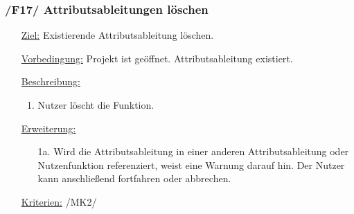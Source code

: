 \documentclass{article}
\begin{document}
\subsubsection*{/F17/ Attributsableitungen löschen}
\begin{itemize}
    \item[\underline{Ziel:}] Existierende Attributsableitung löschen.
    \item[\underline{Vorbedingung:}] Projekt ist geöffnet. Attributsableitung existiert.
    \item[\underline{Beschreibung:}]
    \begin{enumerate}
        \item Nutzer löscht die Funktion.
    \end{enumerate}
    \item[\underline{Erweiterung:}]
    \begin{itemize}
        \item[1a.] Wird die Attributsableitung in einer anderen Attributsableitung oder Nutzenfunktion referenziert, weist eine Warnung darauf hin. Der Nutzer kann anschließend fortfahren oder abbrechen.
    \end{itemize}
    \item[\underline{Kriterien:}] /MK2/
\end{itemize}

\end{document}
